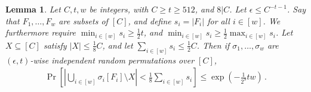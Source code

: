 \documentclass[10pt]{article}
\newtheorem{lemma}[theorem]{Lemma}
\theoremstyle{definition}\newtheorem{definition}[lemma]{Definition}
\theoremstyle{remark}  \newtheorem*{remark}{Remark}
\begin{document}
\begin{lemma}
\label{lem:approx-indep-large-anticoncentration}
  Let $C,t,w$ be integers, with $C \ge t \ge 512$, and $8 | C$. Let $\epsilon \le C^{-t - 1}$. Say that $F_1,\ldots,F_w$ are subsets of $[C]$, and define $s_i = |F_i|$ for all $i \in [w]$. We furthermore require $\min_{i \in [w]} s_i \ge \frac{1}{2} t$, and $\min_{i \in [w]} s_i \ge \frac{1}{2} \max_{i\in[w]} s_i$. Let $X \subseteq [C]$ satisfy $|X| \le \frac{1}{8} C$, and let $\sum_{i \in [w]} s_i \le \frac{1}{2} C$. Then if $\sigma_1,\ldots,\sigma_w$ are $(\epsilon,t)$-wise independent random permutations over $[C]$,
  \begin{align*}
    \Pr\left[\left| \bigcup_{i \in [w]} \sigma_i[F_i] \setminus X \right| < \frac{1}{8} \sum_{i \in [w]} s_i \right] \le \exp(- \frac{1}{2^9} t w) \,.
  \end{align*}
\end{lemma}
\end{document}
